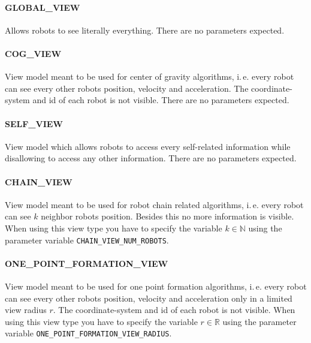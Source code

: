 \paragraph{GLOBAL\_VIEW} Allows robots to see literally everything. There are no parameters expected.

\paragraph{COG\_VIEW} View model meant to be used for center of gravity algorithms, i.\,e. every robot can see every other robots position, velocity and acceleration. The coordinate-system and id of each robot is not visible. There are no parameters expected.

\paragraph{SELF\_VIEW} View model which allows robots to access every self-related information while disallowing to access any other information. There are no parameters expected.

\paragraph{CHAIN\_VIEW} View model meant to be used for robot chain related algorithms, i.\,e. every robot can see $k$ neighbor robots position. Besides this no more information is visible. When using this view type you have to specify the variable $k \in \mathbb{N}$ using the parameter variable \texttt{CHAIN\_VIEW\_NUM\_ROBOTS}.

\paragraph{ONE\_POINT\_FORMATION\_VIEW} View model meant to be used for one point formation algorithms, i.\,e. every robot can see every other robots position, velocity and acceleration only in a limited view radius $r$. The coordinate-system and id of each robot is not visible. When using this view type you have to specify the variable $r \in \mathbb{R}$ using the parameter variable \texttt{ONE\_POINT\_FORMATION\_VIEW\_RADIUS}.


